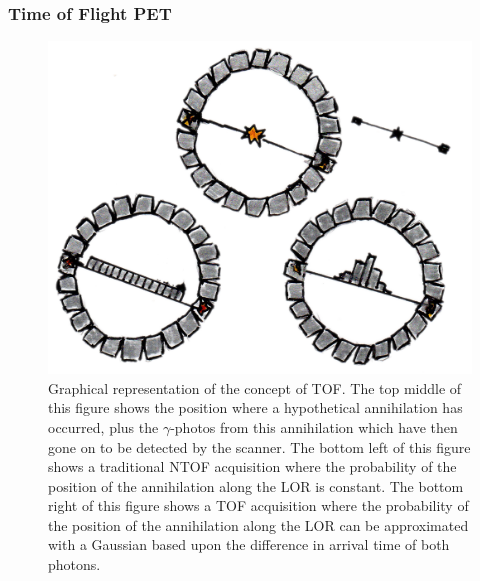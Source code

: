             \subsubsection{Time of Flight PET} \label{sec:time_of_flight_pet}
                \begin{figure}
                    \centering
                    
                    \includegraphics[width=1.0\linewidth]{figures/background_tof.png}
                    
                    \captionsetup{singlelinecheck=false, justification=raggedright}
                    \caption{Graphical representation of the concept of \gls{TOF}. The top middle of this figure shows the position where a hypothetical annihilation has occurred, plus the $\gamma$-photos from this annihilation which have then gone on to be detected by the scanner. The bottom left of this figure shows a traditional \gls{NTOF} acquisition where the probability of the position of the annihilation along the \gls{LOR} is constant. The bottom right of this figure shows a \gls{TOF} acquisition where the probability of the position of the annihilation along the \gls{LOR} can be approximated with a Gaussian based upon the difference in arrival time of both photons.} \label{fig:time_of_flight_pet_tof}
                \end{figure}
                
